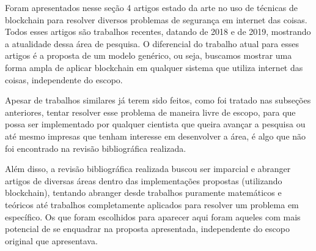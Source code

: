 Foram apresentados nesse seção 4 artigos estado da arte no uso de técnicas de blockchain para resolver diversos problemas de segurança em internet das coisas. Todos esses artigos são trabalhos recentes, datando de 2018 e de 2019, mostrando a atualidade dessa área de pesquisa. O diferencial do trabalho atual para esses artigos é a proposta de um modelo genérico, ou seja, buscamos mostrar uma forma ampla de aplicar blockchain em qualquer sistema que utiliza internet das coisas, independente do escopo.

Apesar de trabalhos similares já terem sido feitos, como foi tratado nas subseções anteriores, tentar resolver esse problema de maneira livre de escopo, para que possa ser implementado por qualquer cientista que queira avançar a pesquisa ou até mesmo impresas que tenham interesse em desenvolver a área, é algo que não foi encontrado na revisão bibliográfica realizada.

Além disso, a revisão bibliográfica realizada buscou ser imparcial e abranger artigos de diversas áreas dentro das implementações propostas (utilizando blockchain), tentando abranger desde trabalhos puramente matemáticos e teóricos até trabalhos completamente aplicados para resolver um problema em específico. Os que foram escolhidos para aparecer aqui foram aqueles com mais potencial de se enquadrar na proposta apresentada, independente do escopo original que apresentava.